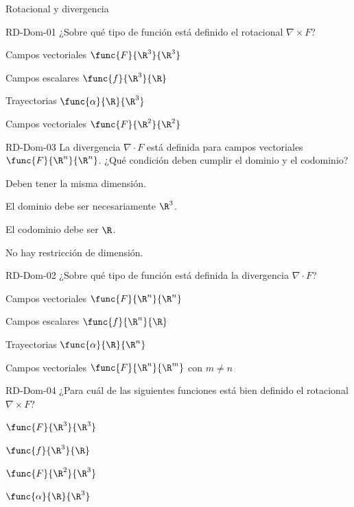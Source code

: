 \documentclass[a4,11pt]{aleph-notas}
\begin{document}
\begin{quiz}{Rotacional y divergencia}
\begin{multi}[]%
    {RD-Dom-01}
    ¿Sobre qué tipo de función está definido el rotacional $\nabla \times F$?
    \item* Campos vectoriales $\func{F}{\R^3}{\R^3}$
    \item Campos escalares $\func{f}{\R^3}{\R}$
    \item Trayectorias $\func{\alpha}{\R}{\R^3}$
    \item Campos vectoriales $\func{F}{\R^2}{\R^2}$
\end{multi}

\begin{multi}[]%
    {RD-Dom-03}
    La divergencia $\nabla \cdot F$ está definida para campos vectoriales $\func{F}{\R^n}{\R^n}$. ¿Qué condición deben cumplir el dominio y el codominio?
    \item* Deben tener la misma dimensión.
    \item El dominio debe ser necesariamente $\R^3$.
    \item El codominio debe ser $\R$.
    \item No hay restricción de dimensión.
\end{multi}

\begin{multi}[]%
    {RD-Dom-02}
    ¿Sobre qué tipo de función está definida la divergencia $\nabla \cdot F$?
    \item* Campos vectoriales $\func{F}{\R^n}{\R^n}$
    \item Campos escalares $\func{f}{\R^n}{\R}$
    \item Trayectorias $\func{\alpha}{\R}{\R^n}$
    \item Campos vectoriales $\func{F}{\R^n}{\R^m}$ con $m\neq n$
\end{multi}

\begin{multi}[]%
    {RD-Dom-04}
    ¿Para cuál de las siguientes funciones está bien definido el rotacional $\nabla \times F$?
    \item* $\func{F}{\R^3}{\R^3}$
    \item $\func{f}{\R^3}{\R}$
    \item $\func{F}{\R^2}{\R^3}$
    \item $\func{\alpha}{\R}{\R^3}$
\end{multi}

\end{quiz}
\end{document}
